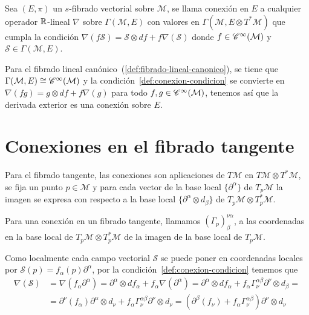 \begin{definition}
  Sea $(E, \pi)$ un $s$-fibrado vectorial sobre $\mathcal{\mathcal{M}}$, se llama conexión en $E$ a cualquier operador $\mathbb{R}$-lineal
  $\nabla$ sobre $\Gamma(\mathcal{M}, E)$ con valores en $\Gamma(\mathcal{M}, E\otimes T^* \mathcal{M})$ que cumpla la condición $\nabla(f\mathcal{S})
  =\mathcal{S}\otimes df+f\nabla(\mathcal{S})$\label{def:conexion-condicion} donde $f\in\mathscr{C}^\infty(\mathcal{M})$ y
  $\mathcal{S}\in\Gamma(\mathcal{M}, E)$.
\end{definition}

Para el fibrado lineal canónico~(\ref{def:fibrado-lineal-canonico}), se tiene que $\Gamma(\mathcal{M}, E)
\cong\mathscr{C}^\infty(\mathcal{M})$ y la condición~\ref{def:conexion-condicion} se convierte en $\nabla(fg)=g\otimes df+f\nabla(g)$
para todo $f,g\in\mathscr{C}^\infty(\mathcal{M})$, tenemos así que la derivada exterior es una conexión sobre $E$.


\section{Conexiones en el fibrado tangente}\label{sec:conexiones-en-el-fibrado-tangente}

Para el fibrado tangente, las conexiones son aplicaciones de $T\mathcal{M}$ en $T\mathcal{M}\otimes T^*\mathcal{M}$, se fija un punto $p\in
\mathcal{M}$ y para cada vector de la base local $\{\partial^\alpha\}$ de $T_p \mathcal{M}$ la imagen se expresa con respecto a la
base local $\{\partial^\alpha\otimes d_\beta\}$ de $T_p\mathcal{M}\otimes T_p^*\mathcal{M}$.

\begin{definition}
  Para una conexión en un fibrado tangente, llamamos $(\Gamma_p)_\beta^{\nu\alpha}$,  a las coordenadas en la base local de $T_p\mathcal{M}\otimes T_p^*\mathcal{M}$ de la imagen
  de la base local de $T_p\mathcal{M}$.
\end{definition}

Como localmente cada campo vectorial $\mathcal{S}$ se
puede poner en coordenadas locales por $\mathcal{S}(p)=f_\alpha(p)\partial^\alpha$, por la condición~\ref{def:conexion-condicion} tenemos que
\begin{equation*}
  \begin{split}
    \nabla(\mathcal{S}) &=\nabla(f_\alpha
    \partial^\alpha)=\partial^\alpha\otimes df_\alpha+f_\alpha\nabla(\partial^\alpha)=
    \partial^\alpha\otimes df_\alpha+f_\alpha\Gamma_\nu^{\alpha\beta}\partial^\nu\otimes d_\beta=\\
    & = \partial^\nu(f_\alpha)\partial^\alpha\otimes d_\nu+f_\alpha\Gamma_\nu^{\alpha\beta}
    \partial^\nu\otimes d_\nu=(\partial^\beta(f_\nu)+f_\alpha\Gamma_\nu^{\alpha\beta})
    \partial^\nu\otimes d_\nu
  \end{split}
\end{equation*}

